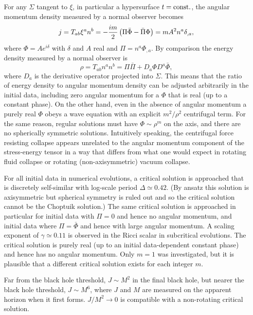 \documentclass{article}
\begin{document}
For any $\Sigma$ tangent to $\xi$, in particular a hypersurface
$t={\rm const.}$, the angular momentum density measured by a normal
observer becomes
\begin{equation}
j=T_{ab}\xi^a n^b = -{im\over 2}\left(\Pi\bar\Phi-\bar\Pi\Phi\right)
=m A^2 n^a \delta_{,a},
\end{equation}
where $\Phi=Ae^{i\delta}$ with $\delta$ and $A$ real and
$\Pi=n^a\Phi_{,a}$. By comparison the energy density measured by a normal
observer is
\begin{equation}
\rho=T_{ab}n^an^b=\Pi\bar\Pi+D_a\Phi D^a\bar\Phi,
\end{equation}
where $D_a$ is the derivative operator projected into $\Sigma$. This
means that the ratio of energy density to angular momentum density can
be adjusted arbitrarily in the initial data, including zero angular
momentum for a $\Phi$ that is real (up to a constant phase). On the
other hand, even in the absence of angular momentum a purely real
$\Phi$ obeys a wave equation with an explicit $m^2/\rho^2$ centrifugal
term.  For the same reason, regular solutions must have
$\Phi\sim\rho^m$ on the axis, and there are no spherically symmetric
solutions. Intuitively
speaking, the centrifugal force resisting collapse appears 
unrelated to the angular momentum component of the stress-energy
tensor in a way that differs from what one would expect in rotating
fluid collapse or rotating (non-axisymmetric) vacuum collapse.

For all initial data in numerical evolutions, a critical solution is
approached that is discretely self-similar with log-scale period
$\Delta\simeq 0.42$. (By ansatz this solution is axisymmetric but
spherical symmetry is ruled out and so the critical solution cannot be
the Choptuik solution.)  The same critical solution is
approached in particular for initial data with $\Pi=0$ and hence no
angular momentum, and initial data where $\Pi=\bar\Phi$ and hence with
large angular momentum.  A scaling exponent of $\gamma\simeq 0.11$ is
observed in the Ricci scalar in subcritical evolutions. The critical
solution is purely real (up to an initial data-dependent constant
phase) and hence has no angular momentum. Only $m=1$ was investigated,
but it is plausible that a different critical solution exists for each
integer $m$.

Far from the black hole threshold, $J\sim M^2$ in the final black
hole, but nearer the black hole threshold, $J\sim M^6$, where $J$ and
$M$ are measured on the apparent horizon when it first
forms. $J/M^2\to 0$ is compatible with a non-rotating critical
solution.
\end{document}
